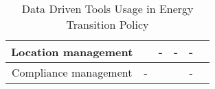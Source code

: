 \begin{table}[htbp!]
\begin{tabular}{c|c|c|c|c|c}
\\ \hline 
      Location management    
     & %
      \cite{Wang2020ASources, Nutkiewicz2017Data-drivenWorkflow}
      & %
      -
      & %
      -
      & %
      -
\\ \hline 
      Compliance management    
     & %
      -
      & %
      \cite{Niemierko2019AData}
      & %
      \cite{Dundon2015TheRegulators}
      & %
      -
 \\
    \hline

    \end{tabular}
    \caption{Data Driven Tools Usage in Energy Transition Policy}
    \label{usage_papers}
\end{table}